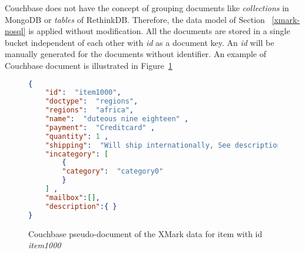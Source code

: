 Couchbase does not have the concept of grouping documents like \textit{collections} in MongoDB  or \textit{tables} of RethinkDB. Therefore, the data model of Section ~\ref{xmark-nosql} is applied without modification. All the documents are stored in a single bucket independent of each other with \textit{id} as a document key. An \textit{id} will be manually generated for the documents without identifier.
 An example of Couchbase document is illustrated in Figure~\ref{code:couchbase-item0}

\begin{figure}
\begin{lstlisting}[language=JSON,  basicstyle =\scriptsize]
{
	"id":  "item1000",
	"doctype":  "regions",
	"regions":  "africa",
	"name":  "duteous nine eighteen" ,
	"payment":  "Creditcard" ,
	"quantity": 1 ,
	"shipping":  "Will ship internationally, See description for charges" ,
	"incategory": [
		{
		"category":  "category0"
		}
	] ,
	"mailbox":[],
	"description":{ }
}
\end{lstlisting} 
\caption{Couchbase pseudo-document of the XMark data for item with id \textit{item1000}}
\label{code:couchbase-item0}
\end{figure}